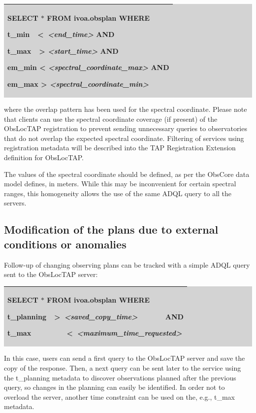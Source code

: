 \documentclass[11pt,a4paper]{ivoa}
\begin{document}
\bigskip
\par
\begingroup\setlength{\fboxsep}{0pt}
\colorbox{lightgray}{%
\begin{tabular}{|p{5.53in}|}
\hline
SELECT $\ast$  FROM ivoa.obsplan WHERE  \par  t\_min\ \ <\   \textit{<end\_time>} AND \par  t\_max\ \ >  \textit{<start\_time> } AND \par  em\_min < \textit{<spectral\_coordinate\_max>} AND \par  em\_max > \textit{<spectral\_coordinate\_min>} \\
\hline
\end{tabular}%
}\endgroup
\par
\bigskip
where the overlap pattern has been used for the spectral coordinate. Please note that clients can use the spectral coordinate coverage (if present) of the ObsLocTAP registration to prevent sending unnecessary queries to observatories that do not overlap the expected spectral coordinate. Filtering of services using registration metadata will be described into the TAP Registration Extension definition for ObsLocTAP.
\par

The values of the spectral coordinate should be defined, as per the ObsCore data model defines, in meters. While this may be inconvenient for certain spectral ranges, this homogeneity allows the use of the same ADQL query to all the servers.

\subsection{Modification of the plans due to external conditions or anomalies}
Follow-up of changing observing plans can be tracked with a simple ADQL query sent to the ObsLocTAP server:


\bigskip
\par
\begingroup\setlength{\fboxsep}{0pt}
\colorbox{lightgray}{%
\begin{tabular}{|p{5.53in}|}
\hline
SELECT $\ast$  FROM ivoa.obsplan WHERE  \par  t\_planning\ \ >\   \textit{<saved\_copy\_time>}\ \ \ \ \ \ \  AND  \par  t\_max\ \ \ \ \ \ \ \ \ <\   \textit{<maximum\_time\_requested>} \\
\hline
\end{tabular}%
}\endgroup
\par
\bigskip
In this case, users can send a first query to the ObsLocTAP server and save the copy of the response. Then, a next query can be sent later to the service using the t\_planning metadata to discover observations planned after the previous query, so changes in the planning can easily be identified. In order not to overload the server, another time constraint can be used on the, e.g., t\_max metadata.
\par
\end{document}
